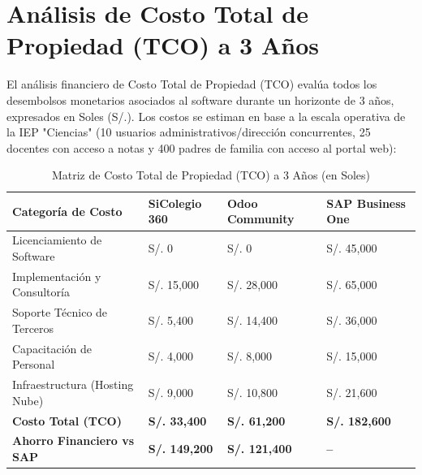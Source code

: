 \documentclass[12pt,a4paper,oneside]{report}
\begin{document}
\newpage

\section{Análisis de Costo Total de Propiedad (TCO) a 3 Años}

El análisis financiero de Costo Total de Propiedad (TCO) evalúa todos los desembolsos monetarios asociados al software durante un horizonte de 3 años, expresados en Soles (S/.). Los costos se estiman en base a la escala operativa de la IEP "Ciencias" (10 usuarios administrativos/dirección concurrentes, 25 docentes con acceso a notas y 400 padres de familia con acceso al portal web):

\begin{table}[H]
\caption{Matriz de Costo Total de Propiedad (TCO) a 3 Años (en Soles)}
\label{tab:tco_comparativo}
\centering
\begin{tabularx}{\textwidth}{l *{3}{>{\raggedleft\arraybackslash}X}}
\toprule
\textbf{Categoría de Costo} & \textbf{SiColegio 360} & \textbf{Odoo Community} & \textbf{SAP Business One} \\
\midrule
Licenciamiento de Software & S/. 0 & S/. 0 & S/. 45,000 \\
Implementación y Consultoría & S/. 15,000 & S/. 28,000 & S/. 65,000 \\
Soporte Técnico de Terceros & S/. 5,400 & S/. 14,400 & S/. 36,000 \\
Capacitación de Personal & S/. 4,000 & S/. 8,000 & S/. 15,000 \\
Infraestructura (Hosting Nube) & S/. 9,000 & S/. 10,800 & S/. 21,600 \\
\midrule
\textbf{Costo Total (TCO)} & \textbf{S/. 33,400} & \textbf{S/. 61,200} & \textbf{S/. 182,600} \\
\midrule
\textbf{Ahorro Financiero vs SAP} & \textbf{S/. 149,200} & \textbf{S/. 121,400} & \textbf{--} \\
\bottomrule
\end{tabularx}
\end{table}
\end{document}
